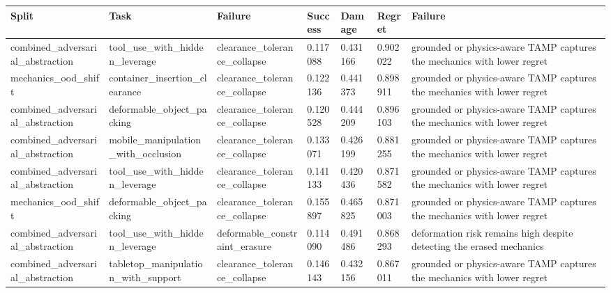 \begin{tabular}{lllllll}
\toprule
Split & Task & Failure & Success & Damage & Regret & Failure \\
\midrule
combined\_adversarial\_abstraction & tool\_use\_with\_hidden\_leverage & clearance\_tolerance\_collapse & 0.117088 & 0.431166 & 0.902022 & grounded or physics-aware TAMP captures the mechanics with lower regret \\
mechanics\_ood\_shift & container\_insertion\_clearance & clearance\_tolerance\_collapse & 0.122136 & 0.441373 & 0.898911 & grounded or physics-aware TAMP captures the mechanics with lower regret \\
combined\_adversarial\_abstraction & deformable\_object\_packing & clearance\_tolerance\_collapse & 0.120528 & 0.444209 & 0.896103 & grounded or physics-aware TAMP captures the mechanics with lower regret \\
combined\_adversarial\_abstraction & mobile\_manipulation\_with\_occlusion & clearance\_tolerance\_collapse & 0.133071 & 0.426199 & 0.881255 & grounded or physics-aware TAMP captures the mechanics with lower regret \\
combined\_adversarial\_abstraction & tool\_use\_with\_hidden\_leverage & clearance\_tolerance\_collapse & 0.141133 & 0.420436 & 0.871582 & grounded or physics-aware TAMP captures the mechanics with lower regret \\
mechanics\_ood\_shift & deformable\_object\_packing & clearance\_tolerance\_collapse & 0.155897 & 0.465825 & 0.871003 & grounded or physics-aware TAMP captures the mechanics with lower regret \\
combined\_adversarial\_abstraction & tool\_use\_with\_hidden\_leverage & deformable\_constraint\_erasure & 0.114090 & 0.491486 & 0.868293 & deformation risk remains high despite detecting the erased mechanics \\
combined\_adversarial\_abstraction & tabletop\_manipulation\_with\_support & clearance\_tolerance\_collapse & 0.146143 & 0.432156 & 0.867011 & grounded or physics-aware TAMP captures the mechanics with lower regret \\
\bottomrule
\end{tabular}
